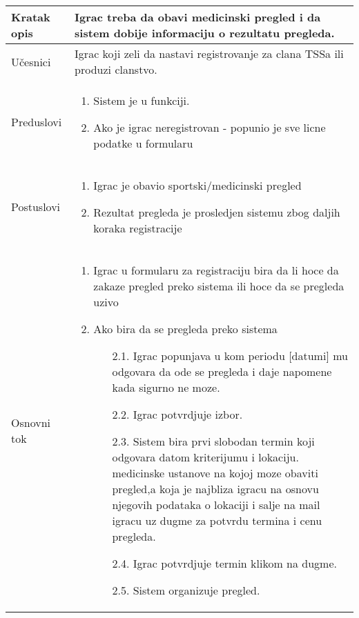\documentclass{article}
\begin{document}

\begin{longtable}{| p{} | p{} |} 
\hline
    Kratak opis & Igrac treba da obavi medicinski pregled i da sistem dobije informaciju o rezultatu pregleda.\\ 
\hline    
    Učesnici & 
         Igrac koji zeli da nastavi registrovanje za clana TSSa ili produzi clanstvo.
    \\
\hline
   Preduslovi & \begin{enumerate}
       \item Sistem je u funkciji.
       \item Ako je igrac neregistrovan - popunio je sve licne podatke u formularu
   \end{enumerate}\\
\hline  
    Postuslovi & \begin{enumerate}
        \item Igrac je obavio sportski/medicinski pregled
        \item Rezultat pregleda je prosledjen sistemu zbog daljih koraka registracije
    \end{enumerate}\\
\hline
    Osnovni tok & \begin{enumerate}
        \item Igrac u formularu za registraciju bira da li hoce da zakaze pregled preko sistema ili hoce da se pregleda uzivo
        \item Ako bira da se pregleda preko sistema
        \begin{itemize}
            \item[2.1.] Igrac popunjava u kom periodu [datumi] mu odgovara da ode se pregleda i daje napomene kada sigurno ne moze.
            \item[2.2.] Igrac potvrdjuje izbor.
            \item[2.3.] Sistem bira prvi slobodan termin koji odgovara datom kriterijumu i lokaciju. medicinske ustanove na kojoj moze obaviti pregled,a koja je najbliza igracu na osnovu njegovih podataka o lokaciji i salje na mail igracu uz dugme za potvrdu termina i cenu pregleda.
            \item[2.4.] Igrac potvrdjuje termin klikom na dugme.
            \item[2.5.] Sistem organizuje pregled.
        \end{itemize}

\end{enumerate}
\end{longtable}
\end{document}
